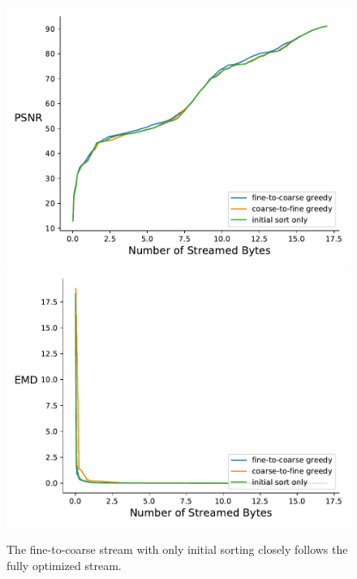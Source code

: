\begin{figure}
        \centering
        \includegraphics[width=0.48\linewidth]{img/figure6/rmse-miranda-viscosity}
        \includegraphics[width=0.48\linewidth]{img/figure6/histogram-miranda-viscosity}
        \caption{The fine-to-coarse stream with only initial sorting closely follows the fully optimized stream.}
\end{figure}
